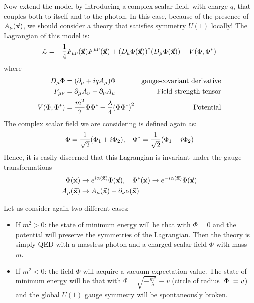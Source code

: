 \documentclass[../main/main.tex]{subfiles}
\begin{document}
Now extend the model by introducing a complex scalar field, with charge \( q \),  that couples both to itself and to the photon. In this case, because of the presence of \( A _ \mu (\va{x}) \), we should consider a theory that satisfies symmetry \( U(1) \) locally! The Lagrangian of this model is:
\begin{equation}
  \mathcal{L} = - \frac{1}{4} F_ {\mu  \nu } (\va{x}) F ^{ \mu \nu } (\va{x})
  + \qty(D _ \mu  \Phi (\va{x}))^* \qty(D _ \mu \Phi (\va{x}))
  - V (\Phi ,\Phi ^*)
\end{equation}
where
\begin{subequations}
\begin{align*}
  D_ \mu \Phi  &= \qty(\partial_ \mu  + i q A _ \mu  ) \Phi   & \text{gauge-covariant derivative}\\
  F_ { \mu \nu } &= \partial_ \mu  A _ \nu  - \partial _ \nu  A _ \mu & \text{Field strength tensor} \\
    V (\Phi , \Phi ^*) &= \frac{m^2}{2} \Phi \Phi ^* + \frac{\lambda }{4} \qty(\Phi \Phi ^*)^2 & \text{Potential}
\end{align*}
\end{subequations}
The complex scalar field we are considering is defined again as:
\begin{equation*}
  \Phi = \frac{1}{\sqrt{2} } \qty(\Phi _1 + i \Phi _2), \quad \Phi ^* = \frac{1}{\sqrt{2} } \qty(\Phi _1 - i \Phi _2)
\end{equation*}
Hence, it is easily discerned that this Lagrangian is invariant under the gauge transformations
\begin{subequations}
\begin{align*}
     \Phi  ( \va{x} ) &\rightarrow e^{i \alpha (\va{x})} \Phi (\va{x}), \quad \Phi^*  ( \va{x} ) \rightarrow e^{-i \alpha (\va{x})} \Phi (\va{x})   \\
      A_\mu (\va{x}) &\rightarrow A_\mu (\va{x}) - \partial_ \nu \alpha  (\va{x})
\end{align*}
\end{subequations}


Let us consider again two different cases:
\begin{itemize}
\item If \( m^2 >0 \): the state of minimum energy will be that with \( \Phi =0 \) and the potential will preserve the symmetries of the Lagrangian. Then the theory is simply QED with a massless photon and a charged scalar field \( \Phi  \) with mass \( m \).

\item If \( m^2 <0 \):  the field \( \Phi  \)  will acquire a vacuum expectation value. The state of minimum energy will be that with  \( \Phi = \sqrt{- \frac{m^2}{\lambda }} \equiv v  \)    (circle of radius \( \abs{\Phi } = v \)) and the global \( U(1) \)  gauge symmetry will be spontaneously broken.
\end{itemize}
\end{document}
